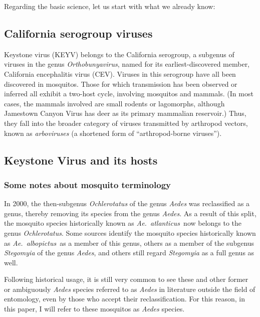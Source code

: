 \documentclass[12pt]{article}
\newcommand{\alb}{\textit{Ae.\ albopictus}}
\newcommand{\atl}{\textit{Ae.\ atlanticus}}
\begin{document}
        Regarding the basic science, let us start with what we already know:

        \subsection{California serogroup viruses}
            \label{california-serogroup}
            Keystone virus (KEYV) belongs to the California serogroup, a subgenus of viruses in the genus \textit{Orthobunyavirus}, named for its earliest-discovered member, California encephalitis virus (CEV). Viruses in this serogroup have all been discovered in mosquitos. Those for which transmission has been observed or inferred all exhibit a two-host cycle, involving mosquitos and mammals. (In most cases, the mammals involved are small rodents or lagomorphs, although Jamestown Canyon Virus has deer as its primary mammalian reservoir.) Thus, they fall into the broader category of viruses transmitted by arthropod vectors, known as \textit{arboviruses} (a shortened form of ``arthropod-borne viruses'').
        
        \subsection{Keystone Virus and its hosts}
            \label{california-keystone}
            \subsubsection{Some notes about mosquito terminology}
                \label{mosquito-terminology}
                In 2000, the then-subgenus \textit{Ochlerotatus} of the genus \textit{Aedes} was reclassified as a genus, thereby removing its species from the genus \textit{Aedes}. As a result of this split, the mosquito species historically known as \atl\ now belongs to the genus \textit{Ochlerotatus}\cite{reinert2000new}. Some sources identify the mosquito species historically known as \alb\ as a member of this genus, others as a member of the subgenus \textit{Stegomyia} of the genus \textit{Aedes}, and others still regard \textit{Stegomyia} as a full genus as well.
                
                Following historical usage, it is still very common to see these and other former or ambiguously \textit{Aedes} species referred to as \textit{Aedes} in literature outside the field of entomology, even by those who accept their reclassification. For this reason, in this paper, I will refer to these mosquitos as \textit{Aedes} species.
\end{document}
